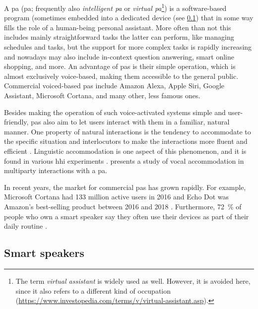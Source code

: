 A \acl{pa} (\acs{pa}; frequently also \emph{intelligent \acl{pa}} or \emph{virtual \acl{pa}}\footnote{The term \emph{virtual assistant} is widely used as well.
However, it is avoided here, since it also refers to a different kind of occupation (\url{https://www.investopedia.com/terms/v/virtual-assistant.asp}).}) is a software-based program (sometimes embedded into a dedicated device (see \cref{subsec:smart_speakers}) that in some way fills the role of a human-being personal assistant.
More often than not this includes mainly straightforward tasks the latter can perform, like managing schedules and tasks, but the support for more complex tasks is rapidly increasing and nowadays may also include in-context question answering, smart online shopping, and more.
An advantage of \acp{pa} is their simple operation, which is almost exclusively voice-based, making them accessible to the general public.
Commercial voiced-based \acp{pa} include Amazon Alexa, Apple Siri, Google Assistant, Microsoft Cortana, and many other, less famous ones.

Besides making the operation of such voice-activated systems simple and user-friendly, \acp{pa} also aim to let users interact with them in a familiar, natural manner.
One property of natural interactions is the tendency to accommodate to the specific situation and interlocutors to make the interactions more fluent and efficient \citep{Gallois2015CAT}.
Linguistic accommodation is one aspect of this phenomenon, and it is found in various \ac{hhi} experiments \citep[e.g.,][]{Pardo2017phonetic,Schweitzer2017social}.
 presents a study of vocal accommodation in multiparty interactions with a \ac{pa}.

In recent years, the market for commercial \acp{pa} has grown rapidly.
For example, Microsoft Cortana had 133 million active users in 2016 \citep{Osborne2016why} and Echo Dot was Amazon's best-selling product between 2016 and 2018 \citep{Dickey2017echo}.
Furthermore, \SI{72}{\percent} of people who own a smart speaker say they often use their devices as part of their daily routine \citep{Kleinberg2018ways}.

\subsection{Smart speakers}
\label{subsec:smart_speakers}

